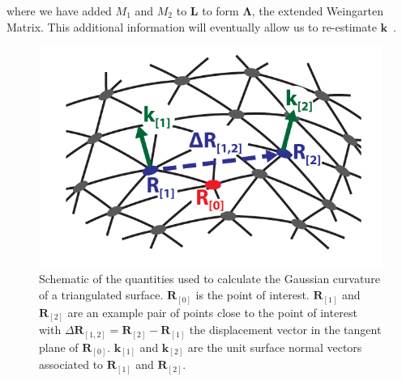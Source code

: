 where we have added $M_1$ and $M_2$ to $\mathbf{L}$ to form $\bm{\Lambda}$, the extended Weingarten Matrix.
This additional information will eventually allow us to re-estimate $\mathbf{k}$~\cite{RN31}.
\begin{figure}
  \centering
  \includegraphics{figures/C3/Ch3-Figs_CurvFitSchem.png}
  \caption{Schematic of the quantities used to calculate the Gaussian curvature of a triangulated surface.
  $\mathbf{R}_{[0]}$ is the point of interest.
  $\mathbf{R}_{[1]}$ and $\mathbf{R}_{[2]}$ are an example pair of points close to the point of interest with $\Delta \mathbf{R}_{[1,2]} = \mathbf{R}_{[2]}-\mathbf{R}_{[1]}$ the displacement vector in the tangent plane of $\mathbf{R}_{[0]}$.
  $\mathbf{k}_{[1]}$ and $\mathbf{k}_{[2]}$ are the unit surface normal vectors associated to $\mathbf{R}_{[1]}$ and $\mathbf{R}_{[2]}$.}\label{f:3-CurvFitSchem}
\end{figure}

